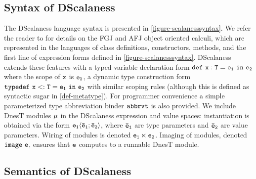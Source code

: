 
\subsection{Syntax of DScalaness}

\scalanesssyntaxfig

The DScalaness language syntax is presented in \autoref{figure-scalanesssyntax}.
We refer the reader to \cite{FJ,AFJ} for details on the FGJ and AFJ object oriented calculi,
which are represented in the languages of class definitions, constructors, methods, and the
first line of expression forms defined in \autoref{figure-scalanesssyntax}. DScalaness extends
these features with a typed variable declaration form $\jdef{x}{T}{e_1}{e_2}$ where the scope of
$\ttt{x}$ is $\tt{e_2}$, a dynamic type construction form $\jtlet{x}{T}{e_1}{e_2}$ with similar
scoping rules (although this is defined as syntactic sugar in \autoref{def-metatype}). For
programmer convenience a simple parameterized type abbreviation binder $\tt{abbrvt}$ is also
provided. We include DnesT modules $\jmodval$ in the DScalaness expression and value spaces:
instantiation is obtained via the form $\jinst{e_1}{\ttvec{e}_1; \ttvec{e}_2}$, where
$\ttvec{e}_\tt{1}$ are type parameters and $\ttvec{e}_\tt{2}$ are value parameters. Wiring of
modules is denoted $\jwire{\tt{e_1}}{\tt{e_2}}$. Imaging of modules, denoted $\jimage{\tt{e}}$,
ensures that $\tt{e}$ computes to a runnable DnesT module.

\subsection{Semantics of DScalaness}

